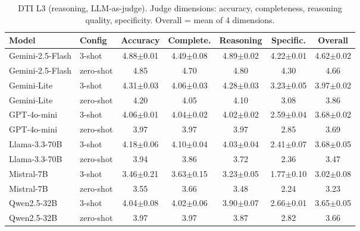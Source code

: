 \begin{table}[h]
\centering
\caption{DTI L3 (reasoning, LLM-as-judge). Judge dimensions: accuracy, completeness, reasoning quality, specificity. Overall = mean of 4 dimensions.}
\label{tab:dti_l3_full}
\scriptsize
\begin{tabular}{@{}llccccc@{}}
\toprule
\textbf{Model} & \textbf{Config} & \textbf{Accuracy} & \textbf{Complete.} & \textbf{Reasoning} & \textbf{Specific.} & \textbf{Overall} \\
\midrule
Gemini-2.5-Flash & 3-shot & 4.88$\pm$0.01 & 4.49$\pm$0.08 & 4.89$\pm$0.02 & 4.22$\pm$0.01 & 4.62$\pm$0.02 \\
Gemini-2.5-Flash & zero-shot & 4.85 & 4.70 & 4.80 & 4.30 & 4.66 \\
Gemini-Lite & 3-shot & 4.31$\pm$0.03 & 4.06$\pm$0.03 & 4.28$\pm$0.03 & 3.23$\pm$0.05 & 3.97$\pm$0.02 \\
Gemini-Lite & zero-shot & 4.20 & 4.05 & 4.10 & 3.08 & 3.86 \\
GPT-4o-mini & 3-shot & 4.06$\pm$0.01 & 4.04$\pm$0.02 & 4.02$\pm$0.02 & 2.59$\pm$0.04 & 3.68$\pm$0.02 \\
GPT-4o-mini & zero-shot & 3.97 & 3.97 & 3.97 & 2.85 & 3.69 \\
Llama-3.3-70B & 3-shot & 4.18$\pm$0.06 & 4.10$\pm$0.04 & 4.03$\pm$0.04 & 2.41$\pm$0.07 & 3.68$\pm$0.05 \\
Llama-3.3-70B & zero-shot & 3.94 & 3.86 & 3.72 & 2.36 & 3.47 \\
Mistral-7B & 3-shot & 3.46$\pm$0.21 & 3.63$\pm$0.15 & 3.23$\pm$0.05 & 1.77$\pm$0.10 & 3.02$\pm$0.08 \\
Mistral-7B & zero-shot & 3.55 & 3.66 & 3.48 & 2.24 & 3.23 \\
Qwen2.5-32B & 3-shot & 4.04$\pm$0.08 & 4.02$\pm$0.06 & 3.90$\pm$0.07 & 2.66$\pm$0.01 & 3.65$\pm$0.05 \\
Qwen2.5-32B & zero-shot & 3.97 & 3.97 & 3.87 & 2.82 & 3.66 \\
\bottomrule
\end{tabular}
\end{table}

